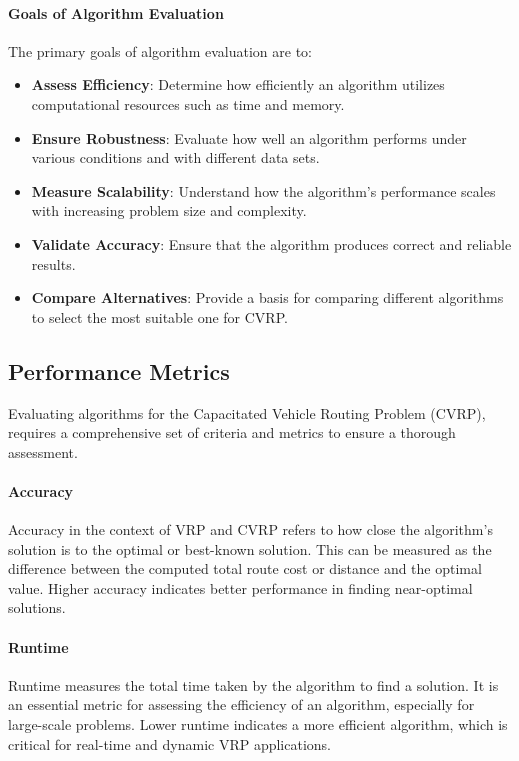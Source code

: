 \documentclass{article}
\begin{document}
    \paragraph{Goals of Algorithm Evaluation}
    The primary goals of algorithm evaluation are to: \cite{staegemann2024}
    \begin{itemize}
        \item \textbf{Assess Efficiency}: Determine how efficiently an algorithm utilizes computational resources such as time and memory.
        \item \textbf{Ensure Robustness}: Evaluate how well an algorithm performs under various conditions and with different data sets.
        \item \textbf{Measure Scalability}: Understand how the algorithm's performance scales with increasing problem size and complexity.
        \item \textbf{Validate Accuracy}: Ensure that the algorithm produces correct and reliable results.
        \item \textbf{Compare Alternatives}: Provide a basis for comparing different algorithms to select the most suitable one for CVRP.
    \end{itemize}

    \subsection{Performance Metrics}
    \label{subsubsec:performance_metrics}
    Evaluating algorithms for the Capacitated Vehicle Routing Problem (CVRP), requires a comprehensive set of criteria and metrics to ensure a thorough assessment.

    \paragraph{Accuracy} Accuracy in the context of VRP and CVRP refers to how close the algorithm’s solution is to the optimal or best-known solution. This can be measured as the difference between the computed total route cost or distance and the optimal value. Higher accuracy indicates better performance in finding near-optimal solutions. \cite{staegemann2024}

    \paragraph{Runtime} Runtime measures the total time taken by the algorithm to find a solution. It is an essential metric for assessing the efficiency of an algorithm, especially for large-scale problems. Lower runtime indicates a more efficient algorithm, which is critical for real-time and dynamic VRP applications. \cite{staegemann2024}
\end{document}

